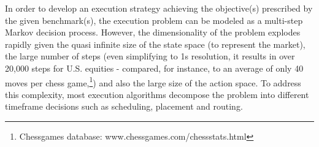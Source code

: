 In order to develop an execution strategy achieving the objective(s) prescribed by the given benchmark(s), the execution problem can be modeled as a multi-step Markov decision process. However, the dimensionality of the problem explodes rapidly given the quasi infinite size of the state space (to represent the market), the large number of steps (even simplifying to 1s resolution, it results in over 20,000 steps for U.S. equities - compared, for instance, to an average of only 40 moves per chess game,\footnote{Chessgames database: www.chessgames.com/chessstats.html}) and also the large size of the action space. To address this complexity, most execution algorithms decompose the problem into different timeframe decisions such as scheduling, placement and routing. 




